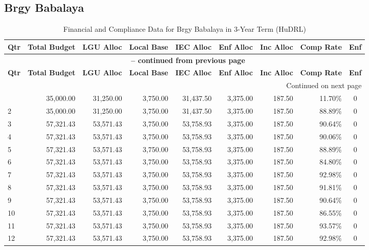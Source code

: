 \subsection{Brgy Babalaya}
\begin{longtable}{lrrrrrrrc}
\caption{Financial and Compliance Data for Brgy Babalaya in 3-Year Term (HuDRL)} \\
\toprule
\textbf{Qtr} & \textbf{Total Budget} & \textbf{LGU Alloc} & \textbf{Local Base} & \textbf{IEC Alloc} & \textbf{Enf Alloc} & \textbf{Inc Alloc} & \textbf{Comp Rate} & \textbf{Enf} \\
\midrule
\endfirsthead
\multicolumn{9}{c}{{\bfseries \tablename\ \thetable{} -- continued from previous page}} \\
\toprule
\textbf{Qtr} & \textbf{Total Budget} & \textbf{LGU Alloc} & \textbf{Local Base} & \textbf{IEC Alloc} & \textbf{Enf Alloc} & \textbf{Inc Alloc} & \textbf{Comp Rate} & \textbf{Enf} \\
\midrule
\endhead
\hline \multicolumn{9}{r}{{Continued on next page}} \\ \hline
\endfoot
\bottomrule
\endlastfoot
1 & 35,000.00 & 31,250.00 & 3,750.00 & 31,437.50 & 3,375.00 & 187.50 & 11.70\% & 0 \\
2 & 35,000.00 & 31,250.00 & 3,750.00 & 31,437.50 & 3,375.00 & 187.50 & 88.89\% & 0 \\
3 & 57,321.43 & 53,571.43 & 3,750.00 & 53,758.93 & 3,375.00 & 187.50 & 90.64\% & 0 \\
4 & 57,321.43 & 53,571.43 & 3,750.00 & 53,758.93 & 3,375.00 & 187.50 & 90.06\% & 0 \\
5 & 57,321.43 & 53,571.43 & 3,750.00 & 53,758.93 & 3,375.00 & 187.50 & 88.89\% & 0 \\
6 & 57,321.43 & 53,571.43 & 3,750.00 & 53,758.93 & 3,375.00 & 187.50 & 84.80\% & 0 \\
7 & 57,321.43 & 53,571.43 & 3,750.00 & 53,758.93 & 3,375.00 & 187.50 & 92.98\% & 0 \\
8 & 57,321.43 & 53,571.43 & 3,750.00 & 53,758.93 & 3,375.00 & 187.50 & 91.81\% & 0 \\
9 & 57,321.43 & 53,571.43 & 3,750.00 & 53,758.93 & 3,375.00 & 187.50 & 90.64\% & 0 \\
10 & 57,321.43 & 53,571.43 & 3,750.00 & 53,758.93 & 3,375.00 & 187.50 & 86.55\% & 0 \\
11 & 57,321.43 & 53,571.43 & 3,750.00 & 53,758.93 & 3,375.00 & 187.50 & 93.57\% & 0 \\
12 & 57,321.43 & 53,571.43 & 3,750.00 & 53,758.93 & 3,375.00 & 187.50 & 92.98\% & 0 \\
\end{longtable}
\newpage
